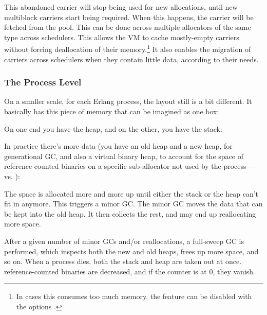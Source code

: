 This abandoned carrier will stop being used for new allocations, until new multiblock carriers start being required. When this happens, the carrier will be fetched from the  pool. This can be done across multiple  allocators of the same type across schedulers. This allows the VM to cache mostly-empty carriers without forcing deallocation of their memory.\footnote{In cases this consumes too much memory, the feature can be disabled with the options .} It also enables the migration of carriers across schedulers when they contain little data, according to their needs.

\subsubsection{The Process Level}
\label{subsec:memory-process-level}

On a smaller scale, for each Erlang process, the layout still is a bit different. It basically has this piece of memory that can be imagined as one box:

\begin{VerbatimText}
[                  ]
\end{VerbatimText}

On one end you have the heap, and on the other, you have the stack:

\begin{VerbatimText}
\end{VerbatimText}

In practice there's more data (you have an old heap and a new heap, for generational GC, and also a virtual binary heap, to account for the space of reference-counted binaries on a specific sub-allocator not used by the process —  vs. ):

\begin{VerbatimText}
\end{VerbatimText}

The space is allocated more and more up until either the stack or the heap can't fit in anymore. This triggers a minor GC. The minor GC moves the data that can be kept into the old heap. It then collects the rest, and may end up reallocating more space.

After a given number of minor GCs and/or reallocations, a full-sweep GC is performed, which inspects both the new and old heaps, frees up more space, and so on. When a process dies, both the stack and heap are taken out at once. reference-counted binaries are decreased, and if the counter is at 0, they vanish.

